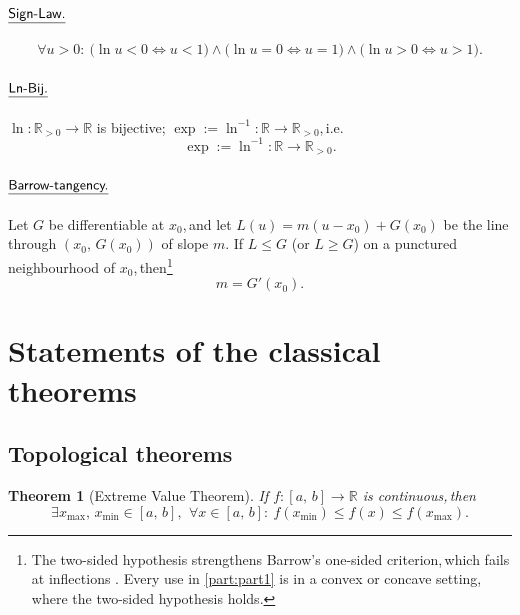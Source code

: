 \documentclass[11pt,reqno]{amsart}
\providecommand{\R}{\mathbb{R}}
\newcommand{\comma}{,\,\allowbreak}
\theoremstyle{redplain}
\newtheorem{theorem}{Theorem}
\begin{document}
\paragraph{$\textsf{\underline{Sign-Law.}}$}\text{\ }
\begin{equation}\label{eq:sign-law}
\forall u>0:\ \bigl(\ln u<0\iff u<1\bigr)\wedge\bigl(\ln u=0\iff u=1\bigr)\wedge\bigl(\ln u>0\iff u>1\bigr).
\end{equation}

\paragraph{$\textsf{\underline{Ln-Bij.}}$}\text{\ } $\ln:\R_{>0}\to\R$ is bijective; $\exp:=\ln^{-1}:\R\to\R_{>0}$\comma i.e.
\begin{equation}\label{eq:ln-bij}
\exp:=\ln^{-1}:\R\to\R_{>0}.
\end{equation}

\paragraph{$\textsf{\underline{Barrow-tangency.}}$}\text{\ } Let $G$ be differentiable at $x_0$\comma and let $L(u)=m(u-x_0)+G(x_0)$ be the line through $(x_0\comma G(x_0))$ of slope $m$. If $L\le G$ (or $L\ge G$) on a punctured neighbourhood of $x_0$\comma then\footnote{The two-sided hypothesis strengthens Barrow's one-sided criterion\comma which fails at inflections \cite{Lopez2026}. Every use in \autoref{part:part1} is in a convex or concave setting\comma where the two-sided hypothesis holds.}
\begin{equation}\label{eq:barrow-tangency}
m=G'(x_0).
\end{equation}


\section{Statements of the classical theorems}

\subsection{Topological theorems}

\begin{theorem}[Extreme Value Theorem]
	\label{thm:evt}
	If $f:[a\comma b]\to\R$ is continuous\comma then
	\begin{equation}\label{eq:evt}
	\exists x_{\max}\comma x_{\min}\in[a\comma b]\comma\ \forall x\in[a\comma b]:\ f(x_{\min})\le f(x)\le f(x_{\max}).
	\end{equation}
\end{theorem}
\end{document}
